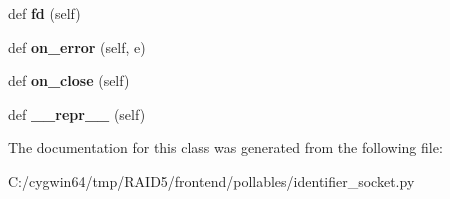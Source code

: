 \begin{DoxyCompactItemize}
def {\bfseries fd} (self)
\item 
\mbox{\label{class_r_a_i_d5_1_1frontend_1_1pollables_1_1identifier__socket_1_1_identifier_socket_ad090eb9bdfc48459afc2106aadb9ae49}} 
def {\bfseries on\+\_\+error} (self, e)
\item 
\mbox{\label{class_r_a_i_d5_1_1frontend_1_1pollables_1_1identifier__socket_1_1_identifier_socket_a5d1417912bb7777d5651711aafc2ca42}} 
def {\bfseries on\+\_\+close} (self)
\item 
\mbox{\label{class_r_a_i_d5_1_1frontend_1_1pollables_1_1identifier__socket_1_1_identifier_socket_a52af183b3f5f502c533d858bbc2a2822}} 
def {\bfseries \+\_\+\+\_\+repr\+\_\+\+\_\+} (self)
\end{DoxyCompactItemize}


The documentation for this class was generated from the following file\+:\begin{DoxyCompactItemize}
\item 
C\+:/cygwin64/tmp/\+R\+A\+I\+D5/frontend/pollables/identifier\+\_\+socket.\+py\end{DoxyCompactItemize}
